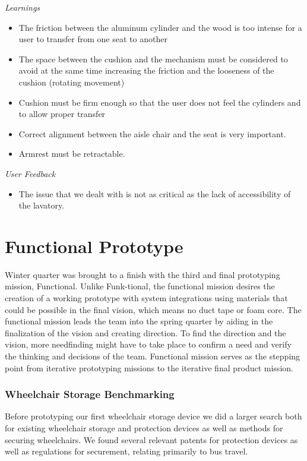 \noindent\emph{Learnings}\\

\begin{itemize}
	\item The friction between the aluminum cylinder and the wood is too intense for a user to transfer from one seat to another
	\item The space between the cushion and the mechanism must be considered to avoid at the same time increasing the friction and the looseness of the cushion (rotating movement)
	\item Cushion must be firm enough so that the user does not feel the cylinders and to allow proper transfer
	\item Correct alignment between the aisle chair and the seat is very important.
	\item Armrest must be retractable.
\end{itemize}


\noindent\emph{User Feedback}\\
\begin{itemize}
	\item The issue that we dealt with is not as critical as the lack of accessibility of the lavatory.
\end{itemize}


\section{Functional Prototype}
Winter quarter was brought to a finish with the third and final prototyping mission, Functional.  Unlike Funk-tional, the functional mission desires the creation of a working prototype with system integrations using materials that could be possible in the final vision, which means no duct tape or foam core. The functional mission leads the team into the spring quarter by aiding in the finalization of the vision and creating direction.  To find the direction and the vision, more needfinding might have to take place to confirm a need and verify the thinking and decisions of the team. Functional mission serves as the stepping point from iterative prototyping missions to the iterative final product mission.

\subsubsection{Wheelchair Storage Benchmarking}
Before prototyping our first wheelchair storage device we did a larger search both for existing wheelchair storage and protection devices as well as methods for securing wheelchairs. We found several relevant patents for protection devices as well as regulations for securement, relating primarily to bus travel. \\

